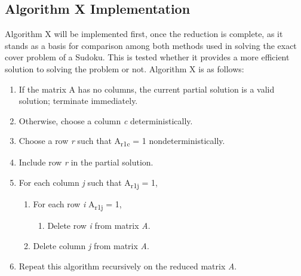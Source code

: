 \documentclass[a4paper,oneside,11pt]{report}
\begin{document}
\subsection{Algorithm X Implementation}
Algorithm X will be implemented first, once the reduction is complete, as it  stands as a basis for comparison among both methods used in solving the exact cover problem of a Sudoku. This is tested whether it provides a more efficient solution to solving the problem or not. Algorithm X is as follows:
\begin{enumerate}
\item If the matrix A has no columns, the current partial solution is a valid solution; terminate immediately.
\vspace{-0.5cm}
\item Otherwise, choose a column \emph{c} deterministically.
\vspace{-0.5cm}
\item Choose a row \emph{r} such that A\textsubscript{r1c}  = 1 nondeterministically.
\vspace{-0.5cm}
\item Include row \emph{r} in the partial solution.
\vspace{-0.5cm}
\item For each column \emph{j} such that A\textsubscript{r1j}  = 1,
\vspace{-0.5cm}
\begin{enumerate}
\item For each row \emph{i} A\textsubscript{r1j}  = 1,
\vspace{-0.5cm}
\begin{enumerate}
\item Delete row \emph{i} from matrix \emph{A}.
\vspace{-0.5cm}
\end{enumerate}
\item Delete column \emph{j} from matrix \emph{A}.
\vspace{-0.5cm}
\end{enumerate}
\item Repeat this algorithm recursively on the reduced matrix \emph{A}.
\end{enumerate}
\end{document}
